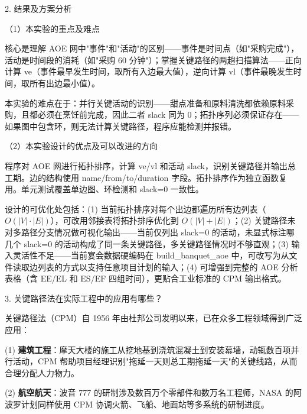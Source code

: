 \noindent\hspace*{2em}2. 结果及方案分析\par
\noindent\hspace*{2em}（1）本实验的重点及难点\par
\noindent\hspace*{2em}核心是理解 AOE 网中"事件"和"活动"的区别——事件是时间点（如"采购完成"），活动是时间段的消耗（如"采购 60 分钟"）；掌握关键路径的两趟扫描算法——正向计算 ve（事件最早发生时间，取所有入边最大值），逆向计算 vl（事件最晚发生时间，取所有出边最小值）。\par
\noindent\hspace*{2em}本实验的难点在于：并行关键活动的识别——甜点准备和原料清洗都依赖原料采购，且都必须在烹饪前完成，因此二者 slack 同为 0；拓扑序列必须保证存在——如果图中包含环，则无法计算关键路径，程序应能检测并报错。\par
\noindent\hspace*{2em}（2）本实验设计的优点及可以改进的方向\par
\noindent\hspace*{2em}程序对 AOE 网进行拓扑排序，计算 ve/vl 和活动 slack，识别关键路径并输出总工期。边的结构使用 name/from/to/duration 字段。拓扑排序作为独立函数复用。单元测试覆盖单边图、环检测和 slack=0 一致性。\par
\noindent\hspace*{2em}设计的可优化处包括：(1) 当前拓扑排序对每个出边都遍历所有边列表（$O(|V|\cdot|E|)$），可改用邻接表将拓扑排序优化到 $O(|V|+|E|)$；(2) 关键路径未对多路径分支情况做可视化输出——当前仅列出 slack=0 的活动，未显式标注哪几个 slack=0 的活动构成了同一条关键路径，多关键路径情况时不够直观；(3) 输入灵活性不足——当前宴会数据硬编码在 build\_banquet\_aoe 中，可改写为从文件读取边列表的方式以支持任意项目计划的输入；(4) 可增强到完整的 AOE 分析表格（含 EE/EL 和 ES/EF 四组时间），更贴合工业标准的 CPM 输出格式。\par
\noindent\hspace*{2em}3. 关键路径法在实际工程中的应用有哪些？\par
\noindent\hspace*{2em}关键路径法（CPM）自 1956 年由杜邦公司发明以来，已在众多工程领域得到广泛应用：\par
\noindent\hspace*{2em}(1) \textbf{建筑工程}：摩天大楼的施工从挖地基到浇筑混凝土到安装幕墙，动辄数百项并行活动，CPM 帮助项目经理识别"拖延一天则总工期拖延一天"的关键线路，从而合理分配人力物力。\par
\noindent\hspace*{2em}(2) \textbf{航空航天}：波音 777 的研制涉及数百万个零部件和数万名工程师，NASA 的阿波罗计划同样使用 CPM 协调火箭、飞船、地面站等多系统的研制进度。\par
